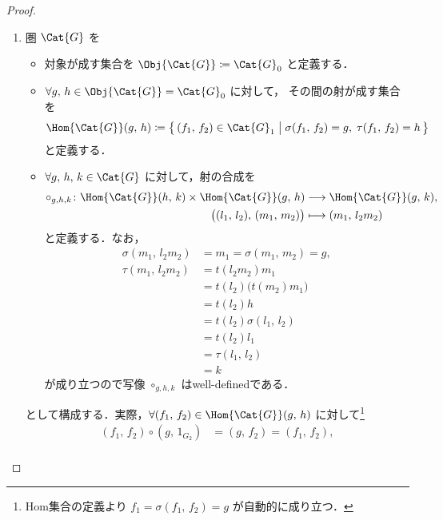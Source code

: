 \documentclass[TQFT_main]{subfiles}
\begin{document}
\begin{proof}
    \begin{enumerate}
        \item 
        圏 $\Cat{G}$ を
        \begin{itemize}
            \item 対象が成す集合を $\Obj{\Cat{G}} \coloneqq \Cat{G}_0$ と定義する．
            \item $\forall g,\, h \in \Obj{\Cat{G}} = \Cat{G}_0$ に対して，
            その間の射が成す集合を 
            \begin{align}
                \Hom{\Cat{G}}(g,\, h) \coloneqq \bigl\{\, (f_1,\, f_2) \in \Cat{G}_1 \bigm| \sigma(f_1,\, f_2) = g,\; \tau(f_1,\, f_2) = h \,\bigr\} 
            \end{align}
            と定義する．
            \item $\forall g,\, h,\, k \in \Cat{G}$ に対して，射の合成を
            \begin{align}
                \circ_{g,h,k} \colon \Hom{\Cat{G}}(h,\, k) \times \Hom{\Cat{G}}(g,\, h) &\lto \Hom{\Cat{G}}(g,\, k), \\
                \bigl( (l_1,\, l_2),\, (m_1,\, m_2) \bigr) &\lmto (m_1,\, l_2m_2)
            \end{align}
            と定義する．なお，
            \begin{align}
                \sigma (m_1,\, l_2m_2) &= m_1 = \sigma (m_1,\, m_2) = g, \\
                \tau (m_1,\, l_2 m_2) &= t(l_2 m_2) m_1 \\
                &= t(l_2)\bigl(t(m_2)m_1\bigr) \\
                &= t(l_2)h \\
                &= t(l_2)\sigma(l_1,\, l_2) \\
                &= t(l_2)l_1 \\
                &= \tau(l_1,\, l_2) \\
                &= k
            \end{align}
            が成り立つので写像 $\circ_{g,h,k}$ はwell-definedである．
        \end{itemize}
        として構成する．実際，$\forall (f_1,\, f_2) \in \Hom{\Cat{G}} (g,\, h)$ に対して\footnote{Hom集合の定義より $f_1 = \sigma(f_1,\, f_2) = g$ が自動的に成り立つ．}
        \begin{align}
            (f_1,\, f_2) \circ (g,\, 1_{G_2}) &= (g,\, f_2) = (f_1,\, f_2), \\

\end{align}
\end{enumerate}
\end{proof}
\end{document}
